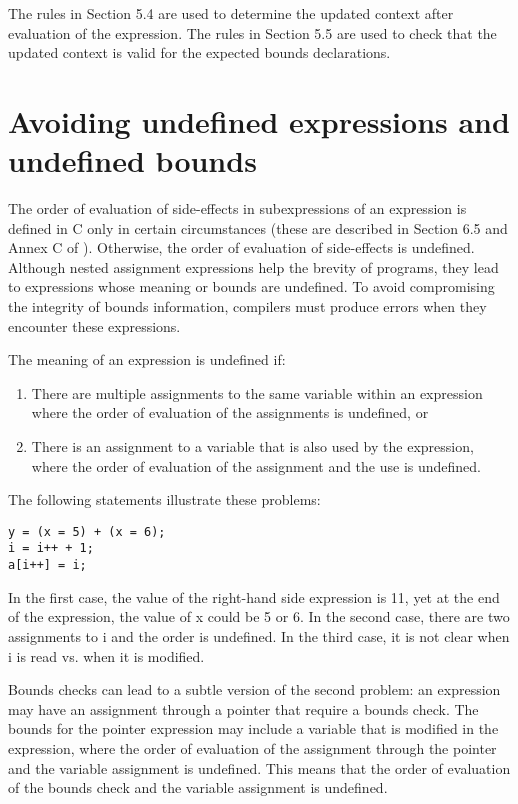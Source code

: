 The rules in Section 5.4 are used to determine the updated context after evaluation of the
expression. The rules in Section 5.5 are used to check that the updated
context is valid for the expected bounds declarations.

\section{Avoiding undefined expressions and undefined bounds}\label{avoiding-undefined-expressions-and-undefined-bounds}

The order of evaluation of side-effects in subexpressions of an
expression is defined in C only in certain circumstances (these are
described in Section 6.5 and Annex C of \cite{ISO2011}). Otherwise, the order of
evaluation of side-effects is undefined. Although nested assignment
expressions help the brevity of programs, they lead to expressions whose
meaning or bounds are undefined. To avoid compromising the integrity of
bounds information, compilers must produce errors when they encounter
these expressions.

The meaning of an expression is undefined if:

\begin{enumerate}
\item
  There are multiple assignments to the same variable within an
  expression where the order of evaluation of the assignments is
  undefined, or
\item
  There is an assignment to a variable that is also used by the
  expression, where the order of evaluation of the assignment and the
  use is undefined.
\end{enumerate}

The following statements illustrate these problems:

\begin{verbatim}
y = (x = 5) + (x = 6);
i = i++ + 1;
a[i++] = i;
\end{verbatim}

In the first case, the value of the right-hand side expression is 11,
yet at the end of the expression, the value of x could be 5 or 6. In the
second case, there are two assignments to i and the order is undefined.
In the third case, it is not clear when i is read vs. when it is
modified.

Bounds checks can lead to a subtle version of the second problem: an
expression may have an assignment through a pointer that require a
bounds check. The bounds for the pointer expression may include a
variable that is modified in the expression, where the order of
evaluation of the assignment through the pointer and the variable
assignment is undefined. This means that the order of evaluation of the
bounds check and the variable assignment is undefined.

